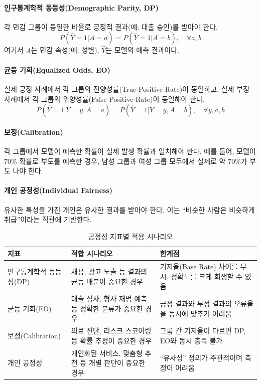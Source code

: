 \paragraph{인구통계학적 동등성(Demographic Parity, DP)}
각 민감 그룹이 동일한 비율로 긍정적 결과(예: 대출 승인)를 받아야 한다.
\[
P(\hat{Y}=1 | A=a) = P(\hat{Y}=1 | A=b), \quad \forall a, b
\]
여기서 $A$는 민감 속성(예: 성별), $\hat{Y}$는 모델의 예측 결과이다.

\paragraph{균등 기회(Equalized Odds, EO)}
실제 긍정 사례에서 각 그룹의 진양성률(True Positive Rate)이 동일하고, 실제 부정 사례에서 각 그룹의 위양성률(False Positive Rate)이 동일해야 한다.
\[
P(\hat{Y}=1 | Y=y, A=a) = P(\hat{Y}=1 | Y=y, A=b), \quad \forall y, a, b
\]

\paragraph{보정(Calibration)}
각 그룹에서 모델이 예측한 확률이 실제 발생 확률과 일치해야 한다. 예를 들어, 모델이 70\% 확률로 부도를 예측한 경우, 남성 그룹과 여성 그룹 모두에서 실제로 약 70\%가 부도 나야 한다.

\paragraph{개인 공정성(Individual Fairness)}
유사한 특성을 가진 개인은 유사한 결과를 받아야 한다. 이는 ``비슷한 사람은 비슷하게 취급''이라는 직관에 기반한다.

\begin{table}[htbp]
\centering
\caption{공정성 지표별 적용 시나리오}
\label{tab:fairness_metrics}
\begin{tabularx}{\textwidth}{p{2.8cm}p{3cm}X}
\toprule
\textbf{지표} & \textbf{적합 시나리오} & \textbf{한계점} \\
\midrule
인구통계학적 동등성(DP) & 채용, 광고 노출 등 결과의 균등 배분이 중요한 경우 & 기저율(Base Rate) 차이를 무시. 정확도를 크게 희생할 수 있음 \\
\midrule
균등 기회(EO) & 대출 심사, 형사 재범 예측 등 정확한 분류가 중요한 경우 & 긍정 결과와 부정 결과의 오류율을 동시에 맞추기 어려움 \\
\midrule
보정(Calibration) & 의료 진단, 리스크 스코어링 등 확률 추정이 중요한 경우 & 그룹 간 기저율이 다르면 DP, EO와 동시 충족 불가 \\
\midrule
개인 공정성 & 개인화된 서비스, 맞춤형 추천 등 개별 판단이 중요한 경우 & ``유사성'' 정의가 주관적이며 측정이 어려움 \\
\bottomrule
\end{tabularx}
\end{table}

